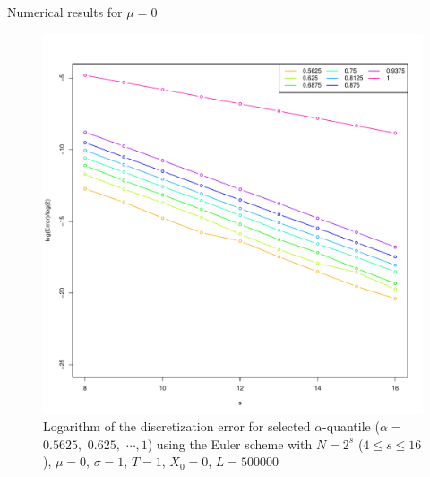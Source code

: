 \documentclass[cjk,10pt]{beamer}
\begin{document}
\begin{frame}{Numerical results for $\mu=0$}
\begin{figure}
   \centering
   \includegraphics[scale=0.3]{nout_0log.pdf} %
   \caption{Logarithm of the discretization error for selected $\alpha$-quantile ($\alpha =$ $0.5625,$ $0.625,$ 
   $\cdots, 1$) using the Euler scheme with $N = 2^s$ ($4\le s \le 16$), $\mu=0$, $\sigma=1$, $T=1$, $X_0=0$, $L=500000$}
   \label{f:lerr}
\end{figure}
\end{frame}
\end{document}

